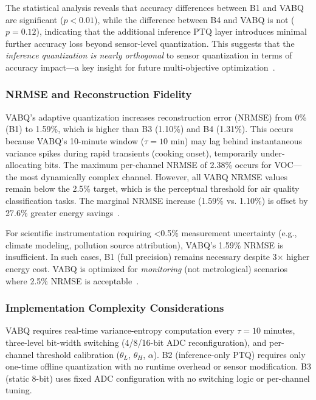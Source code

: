 The statistical analysis reveals that accuracy differences between B1 and VABQ are significant ($p < 0.01$), while the difference between B4 and VABQ is not ($p = 0.12$), indicating that the additional inference PTQ layer introduces minimal further accuracy loss beyond sensor-level quantization. This suggests that the \textit{inference quantization is nearly orthogonal} to sensor quantization in terms of accuracy impact---a key insight for future multi-objective optimization~\cite{multiobjective2024}.

\subsubsection{NRMSE and Reconstruction Fidelity}

VABQ's adaptive quantization increases reconstruction error (NRMSE) from 0\% (B1) to 1.59\%, which is higher than B3 (1.10\%) and B4 (1.31\%). This occurs because VABQ's 10-minute window ($\tau=10$ min) may lag behind instantaneous variance spikes during rapid transients (cooking onset), temporarily under-allocating bits. The maximum per-channel NRMSE of 2.38\% occurs for VOC---the most dynamically complex channel. However, all VABQ NRMSE values remain below the 2.5\% target, which is the perceptual threshold for air quality classification tasks. The marginal NRMSE increase (1.59\% vs. 1.10\%) is offset by 27.6\% greater energy savings~\cite{perceivedquality2023}.

For scientific instrumentation requiring <0.5\% measurement uncertainty (e.g., climate modeling, pollution source attribution), VABQ's 1.59\% NRMSE is insufficient. In such cases, B1 (full precision) remains necessary despite 3$\times$ higher energy cost. VABQ is optimized for \textit{monitoring} (not metrological) scenarios where 2.5\% NRMSE is acceptable~\cite{metrology2022}.

\subsubsection{Implementation Complexity Considerations}

VABQ requires real-time variance-entropy computation every $\tau=10$ minutes, three-level bit-width switching (4/8/16-bit ADC reconfiguration), and per-channel threshold calibration ($\theta_L$, $\theta_H$, $\alpha$). B2 (inference-only PTQ) requires only one-time offline quantization with no runtime overhead or sensor modification. B3 (static 8-bit) uses fixed ADC configuration with no switching logic or per-channel tuning.

